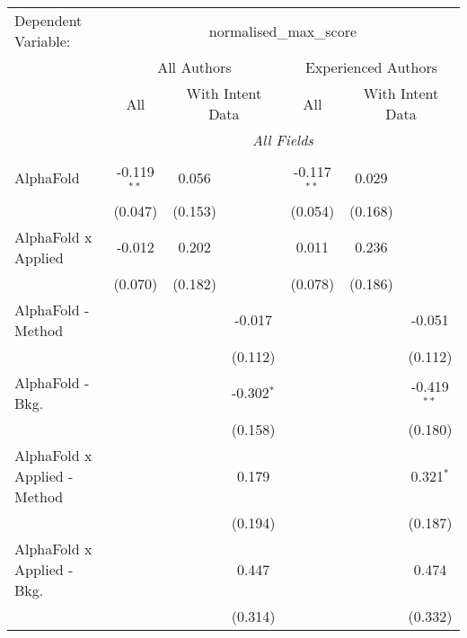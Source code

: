 \begingroup
\centering
\begin{tabular}{lcccccc}
   \tabularnewline \midrule \midrule
   Dependent Variable: & \multicolumn{6}{c}{normalised\_max\_score}\\
 & \multicolumn{3}{c}{All Authors} & \multicolumn{3}{c}{Experienced Authors} \\
\cmidrule(lr){2-4} \cmidrule(lr){5-7}
 & \multicolumn{1}{c}{All} & \multicolumn{2}{c}{With Intent Data} & \multicolumn{1}{c}{All} & \multicolumn{2}{c}{With Intent Data} \\
\cmidrule(lr){2-2} \cmidrule(lr){3-4} \cmidrule(lr){5-5} \cmidrule(lr){6-7}
 & \multicolumn{6}{c}{\textit{All Fields}} \\ \\
   AlphaFold                      & -0.119$^{**}$ & 0.056   &              & -0.117$^{**}$ & 0.029   &   \\   
                                  & (0.047)       & (0.153) &              & (0.054)       & (0.168) &   \\   
   AlphaFold x Applied            & -0.012        & 0.202   &              & 0.011         & 0.236   &   \\   
                                  & (0.070)       & (0.182) &              & (0.078)       & (0.186) &   \\   
   AlphaFold - Method             &               &         & -0.017       &               &         & -0.051\\   
                                  &               &         & (0.112)      &               &         & (0.112)\\   
   AlphaFold - Bkg.               &               &         & -0.302$^{*}$ &               &         & -0.419$^{**}$\\   
                                  &               &         & (0.158)      &               &         & (0.180)\\   
   AlphaFold x Applied - Method   &               &         & 0.179        &               &         & 0.321$^{*}$\\   
                                  &               &         & (0.194)      &               &         & (0.187)\\   
   AlphaFold x Applied - Bkg.     &               &         & 0.447        &               &         & 0.474\\   
                                  &               &         & (0.314)      &               &         & (0.332)\\   

\end{tabular}
